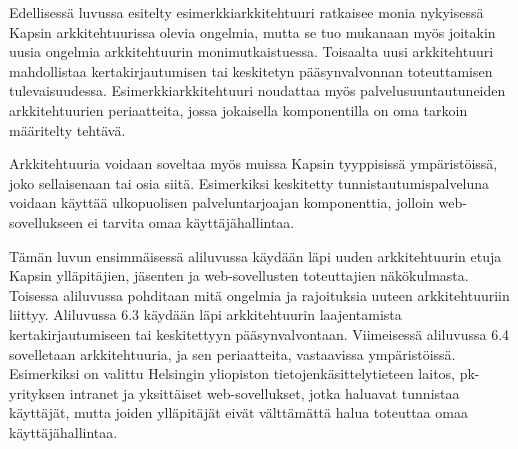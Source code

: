 Edellisessä luvussa esitelty esimerkkiarkkitehtuuri ratkaisee monia nykyisessä Kapsin arkkitehtuurissa olevia ongelmia, mutta se tuo mukanaan myös joitakin uusia ongelmia arkkitehtuurin monimutkaistuessa. Toisaalta uusi arkkitehtuuri mahdollistaa kertakirjautumisen tai keskitetyn pääsynvalvonnan toteuttamisen tulevaisuudessa. Esimerkkiarkkitehtuuri noudattaa myös palvelusuuntautuneiden arkkitehtuurien periaatteita, jossa jokaisella komponentilla on oma tarkoin määritelty tehtävä.

Arkkitehtuuria voidaan soveltaa myös muissa Kapsin tyyppisissä ympäristöissä, joko sellaisenaan tai osia siitä. Esimerkiksi keskitetty tunnistautumispalveluna voidaan käyttää ulkopuolisen palveluntarjoajan komponenttia, jolloin web-sovellukseen ei tarvita omaa käyttäjähallintaa.

Tämän luvun ensimmäisessä aliluvussa käydään läpi uuden arkkitehtuurin etuja Kapsin ylläpitäjien, jäsenten ja web-sovellusten toteuttajien näkökulmasta. Toisessa aliluvussa pohditaan mitä ongelmia ja rajoituksia uuteen arkkitehtuuriin liittyy. Aliluvussa 6.3 käydään läpi arkkitehtuurin laajentamista kertakirjautumiseen tai keskitettyyn pääsynvalvontaan. Viimeisessä aliluvussa 6.4 sovelletaan arkkitehtuuria, ja sen periaatteita, vastaavissa ympäristöissä. Esimerkiksi on valittu Helsingin yliopiston tietojenkäsittelytieteen laitos, pk-yrityksen intranet ja yksittäiset web-sovellukset, jotka haluavat tunnistaa käyttäjät, mutta joiden ylläpitäjät eivät välttämättä halua toteuttaa omaa käyttäjähallintaa.